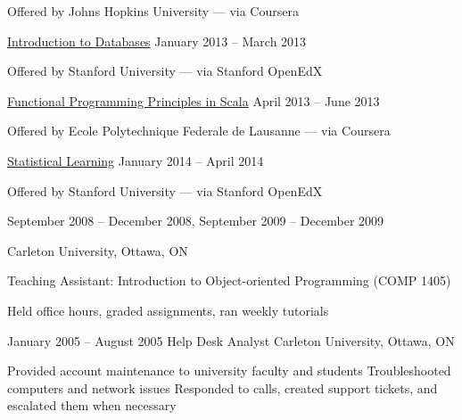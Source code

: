 \documentclass[11pt,article,oneside]{memoir}
\begin{document}
\ind \hspace{0.35in} \footnotesize Offered by Johns Hopkins University --- via Coursera
\normalsize

\ind \href{https://class.stanford.edu/courses/DB/2014/SelfPaced/about}{Introduction to Databases} \hfill January 2013 -- March 2013

\ind \hspace{0.35in} \footnotesize Offered by Stanford University --- via Stanford OpenEdX
\normalsize

\ind \href{https://www.coursera.org/course/progfun}{Functional Programming Principles in Scala} \hfill April 2013 -- June 2013

\ind \hspace{0.35in} \footnotesize Offered by Ecole Polytechnique Federale de Lausanne --- via Coursera
\normalsize

\ind \href{http://online.stanford.edu/course/statistical-learning-winter-2014}{Statistical Learning} \hfill January 2014 -- April 2014

\ind \hspace{0.35in} \footnotesize Offered by Stanford University --- via Stanford OpenEdX
\normalsize

\bigskip
 
\medskip

\vspace{0.05in}
\footnotesize
\ind \hfill  September 2008 -- December 2008, September 2009 -- December 2009 

\ind \hfill  Carleton University, Ottawa, ON

\normalsize
\ind Teaching Assistant: Introduction to Object-oriented Programming (COMP 1405)

\ind \hspace{0.35in} Held office hours, graded assignments, ran weekly tutorials

\vspace{0.2in}
\hfill  \footnotesize January 2005 -- August 2005
\newline \normalsize Help Desk Analyst
\hfill \footnotesize Carleton University, Ottawa, ON

\normalsize
\vspace{0.05in}
\ind \hspace{0.35in} Provided account maintenance to university faculty and students
\newline
\ind \hspace{0.35in} Troubleshooted computers and network issues
\newline
\ind \hspace{0.35in} Responded to calls, created support tickets, and escalated them when necessary
\end{document}
